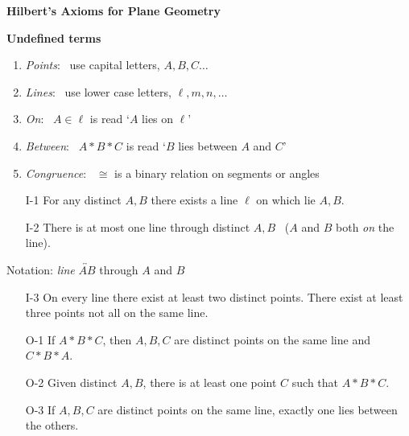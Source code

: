 \begin{center}
	\bfseries\Large Hilbert's Axioms for Plane Geometry
\end{center}

\begin{minipage}[t]{0.48\linewidth}\vspace{0pt}
	\textbf{Undefined terms}
	\begin{enumerate}\itemsep2pt
	  \item \emph{Points}: \ use capital letters, $A,B,C\ldots$
	  \item \emph{Lines}: \ use lower case letters, $\ell,m,n,\ldots$
	  \item \emph{On}: \ $A\in\ell$ is read `$A$ lies on $\ell$'
	  \item \emph{Between}: \ $A*B*C$ is read `$B$ lies between $A$ and $C$'
	  \item \emph{Congruence}: \ $\cong$ is a binary relation on segments or angles
	\end{enumerate}
	
	
	
	\begin{enumerate}
		\item[I-1] For any distinct $A,B$ there exists a line $\ell$ on which lie $A,B$.
		\item[I-2] There is at most one line through distinct $A,B$ \ ($A$ and $B$ both \emph{on} the line).
	\end{enumerate}\vspace{-2pt}
		
	Notation: \emph{line} $\overleftrightarrow{AB}$ through $A$ and $B$\vspace{-2pt}
	
	\begin{enumerate}\setcounter{enumi}{2}	
		\item[I-3] On every line there exist at least two distinct points. There exist at least three points not all on the same line.
	\end{enumerate}
	
	
	
	\begin{enumerate}
		\item[O-1] If $A*B*C$, then $A,B,C$ are distinct points on the same line and $C*B*A$.
		\item[O-2] Given distinct $A,B$, there is at least one point $C$ such that $A*B*C$.
		\item[O-3] If $A,B,C$ are distinct points on the same line, exactly one lies between the others.
	\end{enumerate}\vspace{-2pt}
		

\end{minipage}
